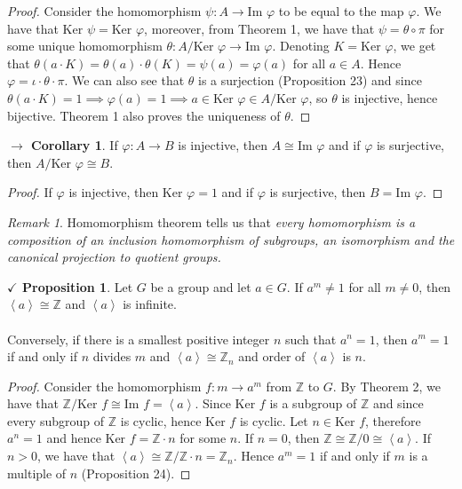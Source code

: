 \documentclass{article}
\theoremstyle{definition}
\theoremstyle{remark}
\newtheorem*{remark}{Remark}
\theoremstyle{definition}
\newtheorem{corollary}{$ \to $ Corollary}
\theoremstyle{definition}
\newtheorem{proposition}{$\checkmark$ Proposition}
\theoremstyle{definition}
\theoremstyle{proof}
\newcommand{\gen}[1]{\left\langle #1\right\rangle}
\newcommand{\image}[0]{\text{Im }}
\newcommand{\kernel}[0]{\text{Ker }}
\newcommand{\isomorph}{\cong}
\begin{document}
\begin{proof}
	Consider the homomorphism $ \psi : A \to \image \varphi $ to be equal to the map $ \varphi $. We have that $ \kernel \psi = \kernel \varphi $, moreover, from Theorem 1, we have that $ \psi = \theta \circ \pi $ for some unique homomorphism $ \theta : A/\kernel \varphi \to \image \varphi $. Denoting $ K = \kernel \varphi $, we get that $ \theta(a\cdot K) = \theta(a)\cdot\theta(K) = \psi(a) = \varphi(a) $ for all $ a\in A $. Hence $ \varphi = \iota \cdot \theta  \cdot \pi$. We can also see that $ \theta $ is a surjection (Proposition 23) and since $ \theta(a\cdot K) = 1 \implies \varphi(a) = 1 \implies a \in \kernel\varphi \in A/\kernel\varphi$, so $ \theta $ is injective, hence bijective. Theorem 1 also proves the uniqueness of $ \theta $.%
\end{proof}
\begin{corollary}
	If $ \varphi: A\to B $ is injective, then $ A\isomorph \image \varphi $ and if $ \varphi $ is surjective, then $ A/\kernel\varphi \isomorph B $.
\end{corollary}
\begin{proof}
	If $ \varphi $ is injective, then $ \kernel \varphi = 1 $ and if $ \varphi $ is surjective, then $ B = \image \varphi $.
\end{proof}
\begin{remark}
	Homomorphism theorem tells us that \emph{every homomorphism is a composition of an inclusion homomorphism of subgroups, an isomorphism and the canonical projection to quotient groups.}
\end{remark}
\hrulefill
\begin{proposition}
	Let $ G $ be a group and let $ a\in G $. If $ a^m \neq 1 $ for all $ m\neq 0 $, then $ \gen{a} \isomorph \mathbb{Z} $ and $ \gen{a} $ is infinite.\\\\
	Conversely, if there is a smallest positive integer $ n $ such that $ a^n = 1 $, then $ a^m = 1 $ if and only if $ n $ divides $ m $ and $ \gen{a} \isomorph \mathbb{Z}_n $ and order of $ \gen{a} $ is $ n $.
\end{proposition}
\begin{proof}
	Consider the homomorphism $f : m \to a^m $ from $ \mathbb{Z} $ to $ G $. By Theorem 2, we have that $ \mathbb{Z}/\kernel f \isomorph \image f = \gen{a} $. Since $ \kernel f $ is a subgroup of $ \mathbb{Z} $ and since every subgroup of $ \mathbb{Z} $ is cyclic, hence $ \kernel f $ is cyclic. Let $ n \in \kernel f $, therefore $ a^n = 1 $ and hence $ \kernel f = \mathbb{Z}\cdot n $ for some $ n $. If $ n=0 $, then $ \mathbb{Z} \isomorph \mathbb{Z}/0 \isomorph \gen{a} $. If $ n>0 $, we have that $ \gen{a} \isomorph \mathbb{Z}/\mathbb{Z}\cdot n = \mathbb{Z}_n $. Hence $ a^m = 1$ if and only if $ m $ is a multiple of $ n $ (Proposition 24).
\end{proof}
\end{document}
